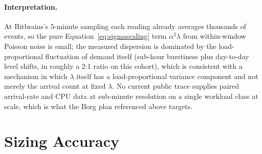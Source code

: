 \documentclass[11pt,a4paper]{article}
\begin{document}
\paragraph{Interpretation.} At Bitbrains's 5-minute sampling each reading
already averages thousands of events, so the pure
Equation~\eqref{eq:sigmascaling} term $\alpha^2\lambda$ from within-window
Poisson noise is small; the measured dispersion is dominated by the
load-proportional fluctuation of demand itself (sub-hour burstiness plus
day-to-day level shifts, in roughly a 2:1 ratio on this cohort), which is
consistent with a mechanism in which $\lambda$ itself has a
load-proportional variance component and not merely the arrival count at
fixed $\lambda$. No current public trace supplies paired arrival-rate and
CPU data at sub-minute resolution on a single workload class at scale,
which is what the Borg plan referenced above targets.

\section{Sizing Accuracy}
\label{sec:sizing}
\end{document}
